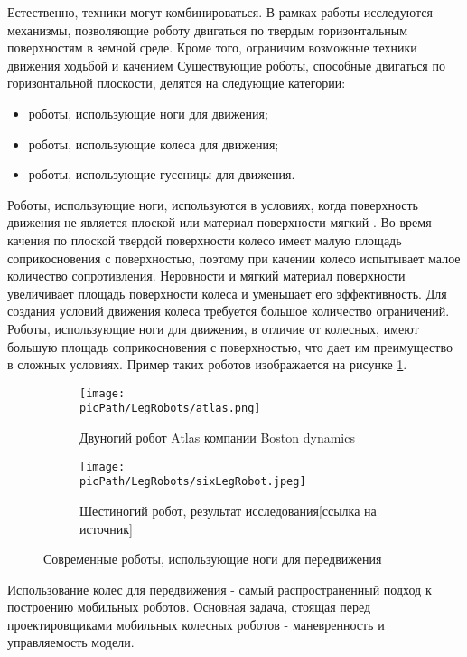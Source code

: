\documentclass[oneside,final,14pt]{extreport}
\newcommand{\picPath}{img}
\begin{document}
Естественно, техники могут комбинироваться. 
 В рамках работы исследуются механизмы, позволяющие роботу двигаться по твердым горизонтальным поверхностям в земной среде. Кроме того, ограничим возможные техники движения ходьбой и качением Существующие роботы, способные двигаться по горизонтальной плоскости, делятся на следующие категории:
\begin{itemize}
\item роботы, использующие ноги для движения;
\item роботы, использующие колеса для движения;
\item роботы, использующие гусеницы для движения.
\end{itemize} 


Роботы, использующие ноги, используются в условиях, когда поверхность движения не является плоской или материал поверхности мягкий \cite{Src:Siegwart}. Во время качения по плоской твердой поверхности колесо имеет малую площадь соприкосновения с поверхностью, поэтому при качении колесо испытывает малое количество сопротивления. Неровности и мягкий материал поверхности увеличивает площадь поверхности колеса и уменьшает его эффективность. Для создания условий движения колеса требуется большое количество ограничений. Роботы, использующие ноги для движения, в отличие от колесных, имеют большую площадь соприкосновения с поверхностью, что дает им преимущество в сложных условиях. Пример таких роботов изображается на рисунке \ref{Figure:LegRobots}.


\begin{figure}[H]
  \centering
  \begin{subfigure}[b]{0.4\linewidth}
   \texttt{[image: \\picPath/LegRobots/atlas.png]}
    \caption{ Двуногий робот Atlas компании Boston dynamics}
  \end{subfigure}
  \begin{subfigure}[b]{0.4\linewidth}
    \texttt{[image: \\picPath/LegRobots/sixLegRobot.jpeg]}
    \caption{ Шестиногий робот, результат исследования[ссылка на источник]}
  \end{subfigure}
  \caption{ Современные роботы, использующие ноги для передвижения}
  \label{Figure:LegRobots}
\end{figure}


Использование колес для передвижения - самый распространенный подход к построению мобильных роботов. Основная задача, стоящая перед проектировщиками мобильных колесных роботов - маневренность и управляемость модели.
\end{document}
